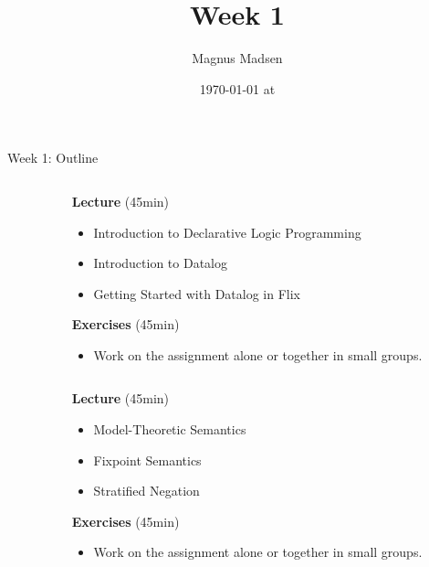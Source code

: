 

\title{Week 1}
\date{\today{} at \currenttime{}}
\author{Magnus Madsen}



\maketitle

\begin{frame}{Week 1: Outline}
\begin{columns}
\begin{column}{.05\textwidth}
\end{column}
\begin{column}{.95\textwidth}
    \footnotesize
\textbf{Lecture} (45min)  \vspace{-2mm}
\begin{itemize}
    \setlength\itemsep{-0.5em}
    \item Introduction to Declarative Logic Programming
    \item Introduction to Datalog
    \item Getting Started with Datalog in Flix
\end{itemize}
\textbf{Exercises} (45min) \vspace{-2mm}
\begin{itemize}
    \item Work on the assignment alone or together in small groups.
\end{itemize}
\end{column}
\end{columns}

\medskip
\medskip
\medskip

\color{gray}
\begin{columns}
\begin{column}{.05\textwidth}
\end{column}
\begin{column}{.95\textwidth}
\footnotesize
\textbf{Lecture} (45min) \vspace{-2mm}
\begin{itemize}
    \color{gray}
    \setlength\itemsep{-0.5em}
    \item Model-Theoretic Semantics
    \item Fixpoint Semantics
    \item Stratified Negation
\end{itemize}
\textbf{Exercises} (45min)  \vspace{-2mm}
\begin{itemize}
    \color{gray}
    \item Work on the assignment alone or together in small groups.
\end{itemize}
\end{column}
\end{columns}
\end{frame}

